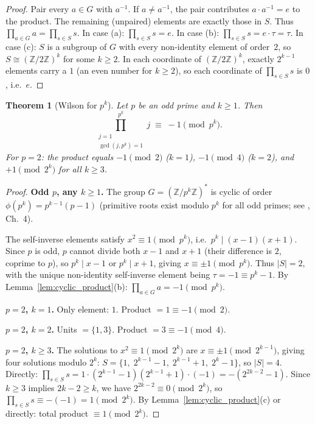 \documentclass[12pt,a4paper]{amsart}
\newtheorem{theorem}{Theorem}[section]
\theoremstyle{definition}
\newcommand{\Z}{\mathbb{Z}}
\begin{document}
\begin{proof}
  Pair every $a \in G$ with $a^{-1}$.  If $a \neq a^{-1}$, the pair contributes
  $a \cdot a^{-1} = e$ to the product.  The remaining (unpaired) elements are
  exactly those in $S$.  Thus $\prod_{a \in G} a = \prod_{s \in S} s$.
  In case (a): $\prod_{s \in S} s = e$.
  In case (b): $\prod_{s \in S} s = e \cdot \tau = \tau$.
  In case (c): $S$ is a subgroup of $G$ with every non-identity element of
  order~$2$, so $S \cong (\Z/2\Z)^k$ for some $k \geq 2$.  In each coordinate
  of $(\Z/2\Z)^k$, exactly $2^{k-1}$ elements carry a $1$ (an even number for
  $k \geq 2$), so each coordinate of $\prod_{s \in S} s$ is $0$, i.e.\ $e$.
\end{proof}

\begin{theorem}[Wilson for $p^k$]\label{thm:wilson_prime_power}
  Let $p$ be an odd prime and $k \geq 1$.  Then
  \[
    \prod_{\substack{j=1 \\ \gcd(j,p^k)=1}}^{p^k} j
    \;\equiv\; -1 \pmod{p^k}.
  \]
  For $p = 2$: the product equals $-1 \pmod{2}$ ($k=1$), $-1 \pmod{4}$ ($k=2$),
  and $+1 \pmod{2^k}$ for all $k \geq 3$.
\end{theorem}

\begin{proof}
  \textbf{Odd $p$, any $k \geq 1$.}
  The group $G = (\Z/p^k\Z)^*$ is cyclic of order $\phi(p^k) = p^{k-1}(p-1)$
  (primitive roots exist modulo $p^k$ for all odd primes; see \cite{Ireland1990}, Ch.~4).

  The self-inverse elements satisfy $x^2 \equiv 1 \pmod{p^k}$, i.e.\
  $p^k \mid (x-1)(x+1)$.  Since $p$ is odd, $p$ cannot divide both $x-1$ and
  $x+1$ (their difference is $2$, coprime to $p$), so $p^k \mid x-1$ or
  $p^k \mid x+1$, giving $x \equiv \pm 1 \pmod{p^k}$.  Thus $|S| = 2$,
  with the unique non-identity self-inverse element being $\tau = -1 \equiv p^k-1$.
  By Lemma~\ref{lem:cyclic_product}(b): $\prod_{a \in G} a = -1 \pmod{p^k}$.

  \textbf{$p = 2$, $k = 1$.}  Only element: $1$.  Product $= 1 \equiv -1 \pmod 2$.

  \textbf{$p = 2$, $k = 2$.}  Units $= \{1, 3\}$.  Product $= 3 \equiv -1 \pmod 4$.

  \textbf{$p = 2$, $k \geq 3$.}
  The solutions to $x^2 \equiv 1 \pmod{2^k}$ are $x \equiv \pm 1 \pmod{2^{k-1}}$,
  giving four solutions modulo $2^k$:
  $S = \{1,\; 2^{k-1}-1,\; 2^{k-1}+1,\; 2^k-1\}$, so $|S| = 4$.
  Directly: $\prod_{s \in S} s = 1 \cdot (2^{k-1}-1)(2^{k-1}+1) \cdot (-1)
  = -(2^{2k-2}-1)$.
  Since $k \geq 3$ implies $2k-2 \geq k$, we have $2^{2k-2} \equiv 0 \pmod{2^k}$,
  so $\prod_{s \in S} s \equiv -(-1) = 1 \pmod{2^k}$.
  By Lemma~\ref{lem:cyclic_product}(c) or directly: total product $\equiv 1 \pmod{2^k}$.
\end{proof}
\end{document}
